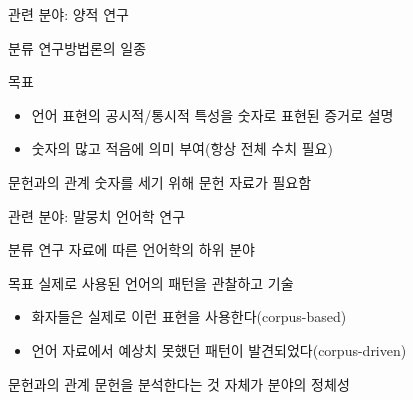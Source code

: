 \documentclass[11pt, aspectratio=169]{beamer}
\begin{document}
\begin{frame}[t]{관련 분야: 양적 연구}
  \begin{block}{분류}
    연구방법론의 일종
  \end{block}

  \begin{block}{목표}
    \begin{itemize}
      \item 언어 표현의 공시적/통시적 특성을 숫자로 표현된 증거로 설명
      \item 숫자의 많고 적음에 의미 부여(항상 전체 수치 필요)
    \end{itemize}
  \end{block}
  
  \begin{block}{문헌과의 관계}
    숫자를 세기 위해 문헌 자료가 필요함
  \end{block}
\end{frame}

\begin{frame}[t]{관련 분야: 말뭉치 언어학 연구}
  \begin{block}{분류}
    연구 자료에 따른 언어학의 하위 분야
  \end{block}

  \begin{block}{목표}
    실제로 사용된 언어의 패턴을 관찰하고 기술
  \end{block}
  \begin{itemize}
    \item 화자들은 실제로 이런 표현을 사용한다(corpus-based)
    \item 언어 자료에서 예상치 못했던 패턴이 발견되었다(corpus-driven)
  \end{itemize}


  \begin{block}{문헌과의 관계}
    문헌을 분석한다는 것 자체가 분야의 정체성
  \end{block}
\end{frame}
\end{document}
